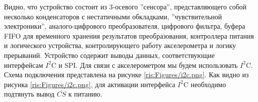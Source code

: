 \begin{sloppypar}

Видно, что устройство состоит из 3-осевого ''сенсора'',  представляющего собой несколько конденсаторов с нестатичными обкладками, ''чувствительной электроники'', аналого-цифрового преобразователя, цифрового фильтра, буфера FIFO для временного хранения результатов преобразования, контроллера питания и логического устройства, контролирующего работу акселерометра и логику прерываний. Устройство содержит выводы данных, соответствующие интерфейсам $I^2$C и SPI. Для связи с акселерометром мы будем использовать $I^2$C. Схема подключения представлена на рисунке \ref{ris:Figures/i2c.png}.
Как видно из рисунка \ref{ris:Figures/i2c.png}, для активации интерфейса $I^2$C необходимо подтянуть вывод $\overline{CS}$ к питанию.




\end{sloppypar}
